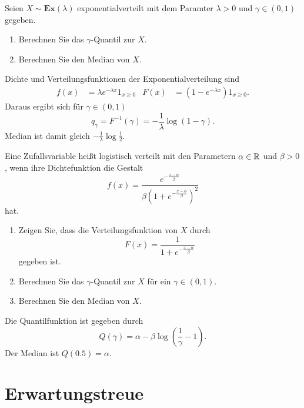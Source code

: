  Seien 
$X\sim \mathbf{Ex}(\lambda)$ exponentialverteilt mit dem Paramter $\lambda>0$
und $\gamma\in (0,1)$ gegeben. 
\begin{enumerate}
    \item Berechnen Sie das $\gamma$-Quantil zur $X$. 
    \item Berechnen Sie den Median von $X$. 
\end{enumerate}

\solution Dichte und Verteilungsfunktionen der Exponentialverteilung
sind
\begin{align*}
    f(x) &= \lambda e^{-\lambda x} 1_{x \geq 0} & F(x) &= \left( 1-e^{-\lambda x} \right)1_{x \geq 0}. 
\end{align*}
Daraus ergibt sich für $\gamma\in (0,1)$ 
\begin{equation*}
    q_{\gamma} = F^{-1}(\gamma) = -\frac{1}{\lambda} \log \left( 1-\gamma \right). 
\end{equation*}
Median ist damit gleich $-\frac{1}{\lambda} \log \frac{1}{2}$. 


 Eine Zufallsvariable heißt
logistisch verteilt mit den Parametern $\alpha\in\mathbb R$ und $\beta>0$, wenn ihre
Dichtefunktion die Gestalt
\begin{equation*}
    f(x) = \frac{e^{-\frac{x-\alpha}{\beta}}}
    {\beta\left( 1+e^{-\frac{x-\alpha}{\beta}} \right)^{2}}
\end{equation*}
hat.
\begin{enumerate}
    \item Zeigen Sie, dass die Verteilungsfunktion von $X$ durch
        \begin{equation*}
            F(x) = \frac{1}{1+e^{-\frac{x-\alpha}{\beta}}}
        \end{equation*}
        gegeben ist.

    \item Berechnen Sie das $\gamma$-Quantil zur $X$ für ein $\gamma\in (0,1)$. 
    \item Berechnen Sie den Median von $X$. 
\end{enumerate}

\solution Die Quantilfunktion ist gegeben durch
\begin{equation*}
    Q(\gamma) = \alpha - \beta \log\left( \frac{1}{\gamma} - 1 \right). 
\end{equation*}
Der Median ist $Q(0.5) = \alpha$.

\section{Erwartungstreue}

